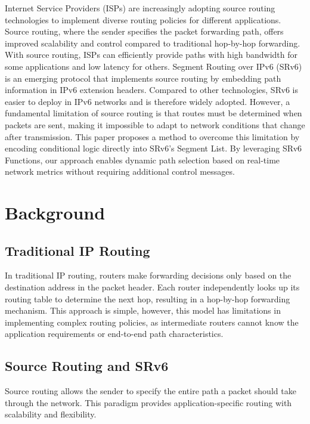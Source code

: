 \documentclass[conference]{IEEEtran}
\begin{document}
Internet Service Providers (ISPs) are increasingly adopting source routing technologies to implement diverse routing policies for different applications\cite{cisco_rakuten_srv6}\cite{softbank_srv6}.
Source routing, where the sender specifies the packet forwarding path, offers improved scalability and control compared to traditional hop-by-hop forwarding.
With source routing, ISPs can efficiently provide paths with high bandwidth for some applications and low latency for others.
Segment Routing over IPv6 (SRv6) is an emerging protocol that implements source routing by embedding path information in IPv6 extension headers.
Compared to other technologies, SRv6 is easier to deploy in IPv6 networks and is therefore widely adopted.
However, a fundamental limitation of source routing is that routes must be determined when packets are sent, making it impossible to adapt to network conditions that change after transmission.
This paper proposes a method to overcome this limitation by encoding conditional logic directly into SRv6's Segment List.
By leveraging SRv6 Functions, our approach enables dynamic path selection based on real-time network metrics without requiring additional control messages.

\section{Background}

\subsection{Traditional IP Routing}

In traditional IP routing, routers make forwarding decisions only based on the destination address in the packet header.
Each router independently looks up its routing table to determine the next hop, resulting in a hop-by-hop forwarding mechanism.
This approach is simple, however, this model has limitations in implementing complex routing policies, as intermediate routers cannot know the application requirements or end-to-end path characteristics.

\subsection{Source Routing and SRv6}

Source routing allows the sender to specify the entire path a packet should take through the network.
This paradigm provides application-specific routing with scalability and flexibility.
\end{document}
